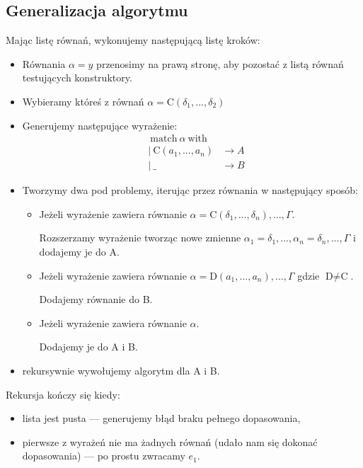 \documentclass{article}
\begin{document}
\subsection{Generalizacja algorytmu}
Mając listę równań, wykonujemy następującą listę kroków:
\begin{itemize}
  \item Równania $\alpha=y$ przenosimy na prawą stronę, aby pozostać z listą równań testujących konstruktory.
  \item Wybieramy któreś z równań $\alpha=\text{C}(\delta_1,...,\delta_2)$
  \item Generujemy następujące wyrażenie:
        \begin{align*}
           & \ \text{match}\ \alpha\ \text{with}                 \\
           & |\  \text{C}(a_1,..., a_n)          & \rightarrow A \\
           & |\ \_                               & \rightarrow B
        \end{align*}
  \item Tworzymy dwa pod problemy, iterując przez równania w następujący sposób:
        \begin{itemize}
          \item Jeżeli wyrażenie zawiera równanie $\alpha=\text{C}(\delta_1,..., \delta_n),...,\Gamma$.

                Rozszerzamy wyrażenie tworząc nowe zmienne $\alpha_1=\delta_1,...,\alpha_n=\delta_n,...,\Gamma$ i dodajemy je do A.
          \item Jeżeli wyrażenie zawiera równanie $\alpha=\text{D}(a_1,..., a_n),...,\Gamma$ gdzie $\text{D}\ne\text{C}$.

                Dodajemy równanie do B.

          \item Jeżeli wyrażenie zawiera równanie $\alpha$.

                Dodajemy je do A i B.
        \end{itemize}
  \item rekursywnie wywołujemy algorytm dla A i B.
\end{itemize}
Rekursja kończy się kiedy: 
\begin{itemize}
  \item lista jest pusta --- generujemy błąd braku pełnego dopasowania,
  \item pierwsze z wyrażeń nie ma żadnych równań (udało nam się dokonać dopasowania) --- po prostu zwracamy $e_1$.
\end{itemize}
\end{document}
